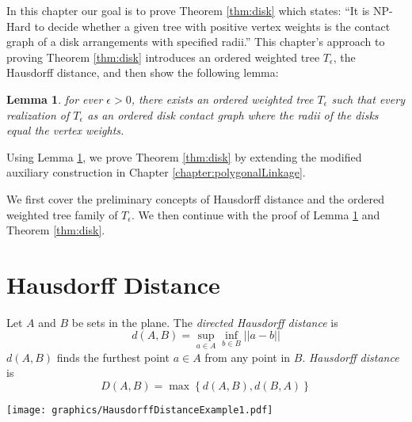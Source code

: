 \documentclass[10pt]{CSUNthesis}
\theoremstyle{plain}%
\newtheorem{lem}{Lemma}
\theoremstyle{definition}
\theoremstyle{remark}
\newcommand{\lr}[1]{\left( #1 \right)}
\begin{document}
In this chapter our goal is to prove Theorem \ref{thm:disk} which states: ``It is NP-Hard to decide whether a given tree with positive vertex weights is the contact graph of a disk arrangements with specified radii.''  
This chapter's approach to proving Theorem \ref{thm:disk} introduces an ordered weighted tree $T_\epsilon$, the Hausdorff distance, and then show the following lemma:
\begin{lem}\label{lem:ch4IntroLemma}
for ever $\epsilon > 0$, there exists an ordered weighted tree $T_\epsilon$ such that every realization of $T_\epsilon$ as an ordered disk contact graph where the radii of the disks equal the vertex weights.
\end{lem} 
Using Lemma \ref{lem:ch4IntroLemma}, we prove Theorem \ref{thm:disk} by extending the modified auxiliary construction in Chapter \ref{chapter:polygonalLinkage}.  

We first cover the preliminary concepts of Hausdorff distance and the ordered weighted tree family of $T_\epsilon$.  
We then continue with the proof of Lemma \ref{lem:ch4IntroLemma} and Theorem \ref{thm:disk}.  
\section{Hausdorff Distance}  
Let $A$ and $B$ be sets in the plane. The \textit{directed Hausdorff distance} is 
\begin{equation}\label{eqn:ContactGraphV3-1}
d\lr{A,B} = \sup_{a \in A} \inf_{b \in B} \left\vert\left\vert a-b \right\vert \right\vert
\end{equation}
$d\lr{A,B}$ finds the furthest point $a \in A$ from any point in $B$.  \textit{Hausdorff distance} is
\begin{equation}\label{eqn:ContactGraphV3-2}
D\lr{A,B} = \max \left\lbrace d\lr{A,B}, d\lr{B,A} \right\rbrace
\end{equation}

\begin{minipage}{\linewidth}
\begin{center}
\texttt{[image: graphics/HausdorffDistanceExample1.pdf]}
\label{fig:HausdorffDistanceExample1.pdf}
\end{center}
\end{minipage}
\end{document}
